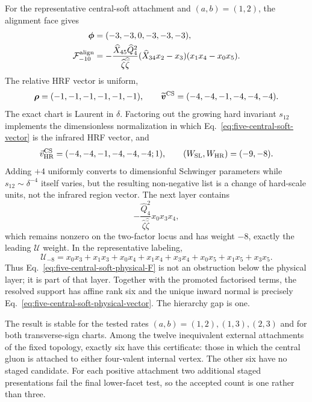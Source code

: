 \documentclass[a4paper,11pt]{article}
\newcommand{\WSL}{W_{\rm SL}}
\newcommand{\WHR}{W_{\rm HR}}
\newcommand{\vHR}{\vec v_{\rm HR}}
\begin{document}
For the representative central-soft attachment and \((a,b)=(1,2)\), the
alignment face gives
\begin{align}
 \boldsymbol\phi&=(-3,-3,0,-3,-3,-3),\nonumber\\
 \mathcal F_{-10}^{\rm align}
 &=-\frac{\widehat X_{45}\widehat Q_4^2}
 {\widehat\zeta\widehat{\bar\zeta}}
 (\widehat X_{34}x_2-x_3)(x_1x_4-x_0x_5).
 \label{eq:five-central-soft-face}
\end{align}
The relative HRF vector is uniform,
\begin{equation}
 \boldsymbol\rho=(-1,-1,-1,-1,-1,-1),
 \qquad
 \widetilde{\boldsymbol v}^{\rm CS}=(-4,-4,-1,-4,-4,-4).
 \label{eq:five-central-soft-vector}
\end{equation}
The exact chart is Laurent in \(\delta\).  Factoring out the growing hard
invariant \(s_{12}\) implements the dimensionless normalization in which
Eq.~\eqref{eq:five-central-soft-vector} is the infrared HRF vector, and
\begin{equation}
 \vHR^{\rm CS}=(-4,-4,-1,-4,-4,-4;1),
 \qquad (\WSL,\WHR)=(-9,-8).
 \label{eq:five-central-soft-physical-vector}
\end{equation}
Adding \(+4\) uniformly converts to dimensionful Schwinger parameters while
\(s_{12}\sim\delta^{-4}\) itself varies, but the resulting non-negative list
is a change of hard-scale units, not the infrared region vector.
The next layer contains
\begin{equation}
 -\frac{\widehat Q_4^2}
 {\widehat\zeta\widehat{\bar\zeta}}x_0x_3x_4,
 \label{eq:five-central-soft-physical-F}
\end{equation}
which remains nonzero on the two-factor locus and has weight \(-8\), exactly
the leading \(\mathcal U\) weight.  In the representative labeling,
\begin{equation}
 \mathcal U_{-8}=x_0x_3+x_1x_3+x_0x_4+x_1x_4+x_3x_4
                 +x_0x_5+x_1x_5+x_3x_5.
 \label{eq:five-central-soft-U}
\end{equation}
Thus Eq.~\eqref{eq:five-central-soft-physical-F} is not an obstruction below
the physical layer; it is part of that layer.  Together with the promoted
factorised terms, the resolved support has affine rank six and the unique
inward normal is precisely
Eq.~\eqref{eq:five-central-soft-physical-vector}.  The hierarchy gap is one.

The result is stable for the tested rates \((a,b)=(1,2),(1,3),(2,3)\) and
for both transverse-sign charts.  Among the twelve inequivalent external
attachments of the fixed topology, exactly six have this certificate:
those in which the central gluon is attached to either four-valent internal
vertex.  The other six have no staged candidate.  For each positive
attachment two additional staged presentations fail the final lower-facet
test, so the accepted count is one rather than three.
\end{document}
